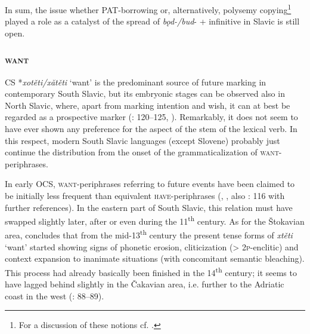 \documentclass[output=paper,colorlinks,citecolor=brown]{langscibook}
\begin{document}
In sum, the issue whether PAT-borrowing or, alternatively, polysemy copying\footnote{For a discussion of these notions cf. \citet[26--29]{wiemer_walchli_2012}.} played a role as a catalyst of the spread of \textit{bǫd-/bud}- + infinitive in Slavic is still open. 




\subsubsection{\textsc{want}}\label{sec:wiemer:3.2.2}

CS *\textit{xotěti/xătěti} ‘want’ is the predominant source of future marking in contemporary South Slavic, but its embryonic stages can be observed also in North Slavic, where, apart from marking intention and wish, it can at best be regarded as a prospective marker (\cite{Křížková1960}: 120--125, \cite{seveleva2021}). Remarkably, it does not seem to have ever shown any preference for the aspect of the stem of the lexical verb. In this respect, modern South Slavic languages (except Slovene) probably just continue the distribution from the onset of the grammaticalization of \textsc{want}-periphrases.

In early OCS, \textsc{want}-periphrases referring to future events have been claimed to be initially less frequent than equivalent \textsc{have}-periphrases (\cite{Birnbaum1958}, \cite{Grković-Mejdžor1995}, also \cite{Xaralampiev1981}: 116 with further references). In the eastern part of South Slavic, this relation must have swapped slightly later, after or even during the 11\textsuperscript{th} century. As for the Štokavian area, \citet{Grković-Mejdžor2012} concludes that from the mid-13\textsuperscript{th} century the present tense forms of \textit{xtěti} ‘want’ started showing signs of phonetic erosion, cliticization (> \textsc{2p}-enclitic) and context expansion to inanimate situations (with concomitant semantic bleaching). This process had already basically been finished in the 14\textsuperscript{th} century; it seems to have lagged behind slightly in the Čakavian area, i.e. further to the Adriatic coast in the west (\cite{Grković-Mejdžor2012}: 88--89). 
\end{document}
